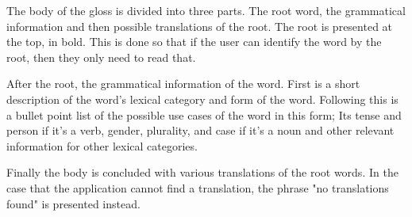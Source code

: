 The body of the gloss is divided into three parts. The root word, the grammatical information and then possible translations of the root. The root is presented at the top, in bold. This is done so that if the user can identify the word by the root, then they only need to read that. 

After the root, the grammatical information of the word. First is a short description of the word's lexical category and form of the word. Following this is a bullet point list of the possible use cases of the word in this form; Its tense and person if it's a verb, gender, plurality, and case if it's a noun and other relevant information for other lexical categories. 

Finally the body is concluded with various translations of the root words. In the case that the application cannot find a translation, the phrase "no translations found" is presented instead. 
 